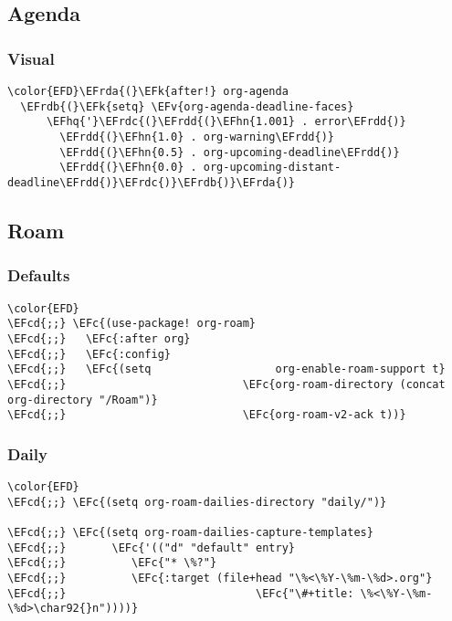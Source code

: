 \documentclass[12pt]{article}
\theoremstyle{plain}%
\theoremstyle{definition}
\theoremstyle{remark}
\newcommand{\EFc}[1]{\textcolor{EFc}{#1}} %
\newcommand{\EFcd}[1]{\textcolor{EFcd}{#1}} %
\newcommand{\EFk}[1]{\textcolor{EFk}{#1}} %
\newcommand{\EFv}[1]{\textcolor{EFv}{#1}} %
\newcommand{\EFhn}[1]{\textcolor{EFhn}{\textbf{#1}}} %
\newcommand{\EFhq}[1]{\textcolor{EFhq}{#1}} %
\newcommand{\EFrda}[1]{\textcolor{EFrda}{#1}} %
\newcommand{\EFrdb}[1]{\textcolor{EFrdb}{#1}} %
\newcommand{\EFrdc}[1]{\textcolor{EFrdc}{#1}} %
\newcommand{\EFrdd}[1]{\textcolor{EFrdd}{#1}} %
\begin{document}
\subsection{Agenda}
\label{sec:orgbd9c18a}
\subsubsection{Visual}
\label{sec:orgd5ef773}
\begin{Code}
\begin{Verbatim}
\color{EFD}\EFrda{(}\EFk{after!} org-agenda
  \EFrdb{(}\EFk{setq} \EFv{org-agenda-deadline-faces}
      \EFhq{'}\EFrdc{(}\EFrdd{(}\EFhn{1.001} . error\EFrdd{)}
        \EFrdd{(}\EFhn{1.0} . org-warning\EFrdd{)}
        \EFrdd{(}\EFhn{0.5} . org-upcoming-deadline\EFrdd{)}
        \EFrdd{(}\EFhn{0.0} . org-upcoming-distant-deadline\EFrdd{)}\EFrdc{)}\EFrdb{)}\EFrda{)}
\end{Verbatim}
\end{Code}
\subsection{Roam}
\label{sec:orgbb1c0af}
\subsubsection{Defaults}
\label{sec:orgffbd0cc}
\begin{Code}
\begin{Verbatim}
\color{EFD}
\EFcd{;;} \EFc{(use-package! org-roam}
\EFcd{;;}   \EFc{:after org}
\EFcd{;;}   \EFc{:config}
\EFcd{;;}   \EFc{(setq                   org-enable-roam-support t}
\EFcd{;;}                           \EFc{org-roam-directory (concat org-directory "/Roam")}
\EFcd{;;}                           \EFc{org-roam-v2-ack t))}

\end{Verbatim}
\end{Code}
\subsubsection{Daily}
\label{sec:org6071103}
\begin{Code}
\begin{Verbatim}
\color{EFD}
\EFcd{;;} \EFc{(setq org-roam-dailies-directory "daily/")}

\EFcd{;;} \EFc{(setq org-roam-dailies-capture-templates}
\EFcd{;;}       \EFc{'(("d" "default" entry}
\EFcd{;;}          \EFc{"* \%?"}
\EFcd{;;}          \EFc{:target (file+head "\%<\%Y-\%m-\%d>.org"}
\EFcd{;;}                             \EFc{"\#+title: \%<\%Y-\%m-\%d>\char92{}n"))))}
\end{Verbatim}
\end{Code}
\end{document}
